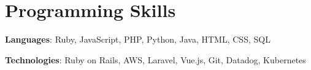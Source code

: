 \documentclass[letterpaper,11pt]{article}
\newcommand{\resumeSubHeadingListStart}{\begin{itemize}[leftmargin=*]}
\newcommand{\resumeSubHeadingListEnd}{\end{itemize}}
\begin{document}
\section{Programming Skills}
 \resumeSubHeadingListStart
   \item{
     \textbf{Languages}{: Ruby, JavaScript, PHP, Python, Java, HTML, CSS, SQL}
     \hfill
   \item
     \textbf{Technologies}{: Ruby on Rails, AWS, Laravel, Vue.js, Git, Datadog, Kubernetes}
   }
 \resumeSubHeadingListEnd

\end{document}
